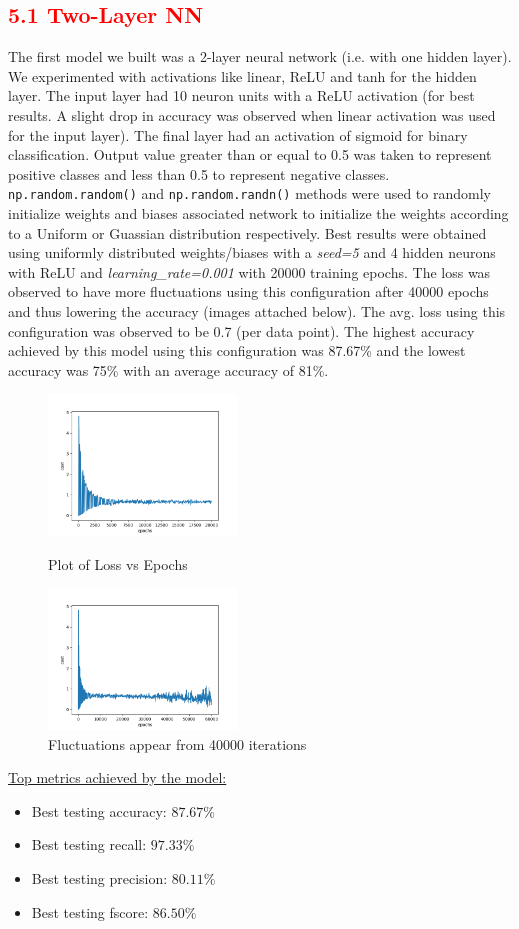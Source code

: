 \documentclass[a4paper,10pt,twocolumn]{article}
\begin{document}
\subsection*{\textcolor{red}{5.1 Two-Layer NN}}
The first model we built was a 2-layer neural network (i.e. with one hidden layer). We experimented with activations like linear, ReLU and tanh for the hidden layer. The input layer had 10 neuron units with a ReLU activation (for best results. A slight drop in accuracy was observed when linear activation was used for the input layer). The final layer had an activation of sigmoid for binary classification. Output value greater than or equal to 0.5 was taken to represent positive classes and less than 0.5 to represent negative classes.
\texttt{np.random.random()} and \texttt{np.random.randn()} methods were used to randomly initialize weights and biases associated network to initialize the weights according to a Uniform or Guassian distribution respectively. Best results were obtained using uniformly distributed weights/biases with a \emph{seed=5} and 4 hidden neurons with ReLU and \emph{learning\_rate=0.001} with 20000 training epochs. The loss was observed to have more fluctuations using this configuration after 40000 epochs and thus lowering the accuracy (images attached below). The avg. loss using this configuration was observed to be 0.7 (per data point). The highest accuracy achieved by this model using this configuration was 87.67\% and the lowest accuracy was 75\% with an average accuracy of 81\%.
\begin{figure}[h]
\centering
\includegraphics[scale=1.0, width=5cm]{Fig11.png}
\caption{Plot of Loss vs Epochs}
\includegraphics[scale=1.0, width=5cm]{Fig12.png}
\caption{Fluctuations appear from 40000 iterations}
\end{figure}
\newline
\underline{Top metrics achieved by the model:}
\begin{itemize}
\item{Best testing accuracy: $87.67\%$}
\item{Best testing recall: $97.33\%$}
\item{Best testing precision: $80.11\%$}
\item{Best testing fscore: $86.50\%$}
\end{itemize}
\end{document}

